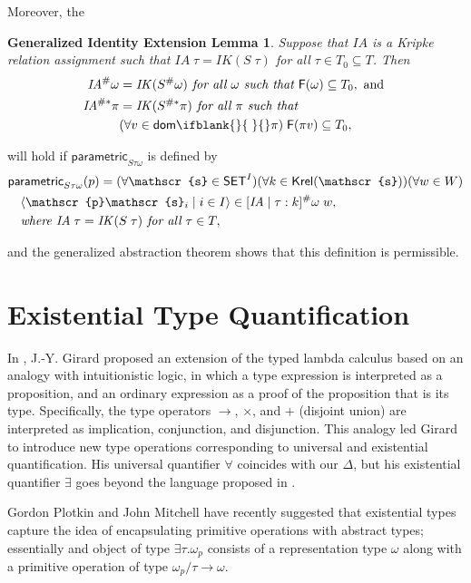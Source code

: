 \documentclass[sigplan,screen,nonacm,balance=false]{acmart}
\theoremstyle{plain}
\DeclarePairedDelimiter{\pair}{\langle}{\rangle}
\newcommand{\dom}[1]{\mathsf{dom}\ifblank{#1}{\;}{#1}}
\newcommand{\FV}{\mathsf{F}}
\newcommand{\SET}{\mathsf{SET}}
\newcommand{\para}{\mathsf{parametric}}
\newcommand{\Krel}{\mathsf{Krel}}
\newcommand{\IA}{\mathit{IA}}
\newcommand{\IK}{\mathit{IK}}
\newcommand{\scrs}{\mathscr{s}}
\newcommand{\scrp}{\mathscr{p}}
\begin{document}
Moreover, the

\newtheorem*{genIEL}{Generalized Identity Extension Lemma}
\begin{genIEL}
  Suppose that $\IA$ is a Kripke relation assignment such that $\IA \; \tau = \IK(S \; \tau)$ for all $\tau \in T_0 \subseteq T$.
  Then
  \begin{align*}
    \IA^\# \omega &= \IK(S^\# \omega) \textit{ for all } \omega \textit{ such that } \FV(\omega) \subseteq T_0, \text{ and } \\
    \IA^{\#*} \pi &= \IK(S^{\#*} \pi) \textit{ for all } \pi \textit{ such that } \\
    & (\forall v \in \dom{} \pi) \; \FV(\pi v) \subseteq T_0,
  \end{align*}
\end{genIEL}

will hold if $\para_{S \tau \omega}$ is defined by
%
\begin{align*}
  & \para_{S \tau \omega}(p) =
  (\forall \scrs \in \SET^I) (\forall k \in \Krel(\scrs)) (\forall w \in W) \\
  & \quad \pair{\scrp \scrs_i \mid i \in I} \in [\IA \mid \tau: k]^\# \omega \; w, \\
  & \quad \textit{where } \IA \; \tau = \IK(S \; \tau) \textit{ for all } \tau \in T,
\end{align*}

and the generalized abstraction theorem shows that this definition is permissible.

\section{Existential Type Quantification}

In \citep{SystemF}, J.-Y. Girard proposed an extension of the typed lambda calculus based on an analogy with intuitionistic logic, in which a type expression is interpreted as a proposition, and an ordinary expression as a proof of the proposition that is its type.
Specifically, the type operators $\to$, $\times$, and $+$ (disjoint union) are interpreted as implication, conjunction, and disjunction.
This analogy led Girard to introduce new type operations corresponding to universal and existential quantification.
His universal quantifier $\forall$ coincides with our $\Delta$, but his existential quantifier $\exists$ goes beyond the language proposed in \citep{polymorphism}.

Gordon Plotkin and John Mitchell have recently suggested that existential types capture the idea of encapsulating primitive operations with abstract types; essentially and object of type $\exists \tau. \omega_p$ consists of a representation type $\omega$ along with a primitive operation of type $\omega_p/\tau \to \omega$.
\end{document}
